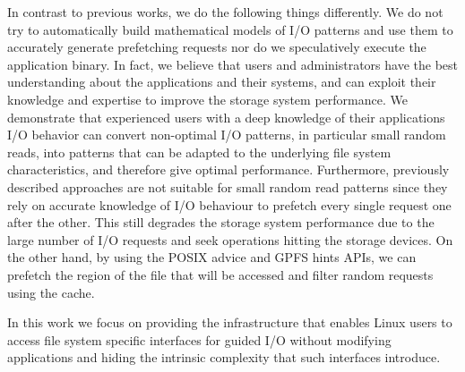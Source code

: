 In contrast to previous works, we do the following things differently. We do not try to automatically build mathematical models of I/O patterns and use them to accurately generate prefetching requests nor do we speculatively execute the application 
binary. In fact, we believe that users and administrators have the best understanding about the applications and their systems, and can exploit their knowledge and expertise to improve the storage system performance. We demonstrate that experienced 
users with a deep knowledge of their applications I/O behavior can convert non-optimal I/O patterns, in particular small random reads, into patterns that can be adapted to the underlying file system characteristics, and therefore give optimal 
performance. Furthermore, previously described approaches are not suitable for small random read patterns since they rely on accurate knowledge of I/O behaviour to prefetch every single request one after the other. This still degrades the storage 
system performance due to the large number of I/O requests and seek operations hitting the storage devices. On the other hand, by using the POSIX advice and GPFS hints APIs, we can prefetch the region of the file that will be accessed and filter 
random requests using the cache.

In this work we focus on providing the infrastructure that enables Linux users to access file system specific interfaces for guided I/O without modifying applications and hiding the intrinsic complexity that such interfaces introduce.
